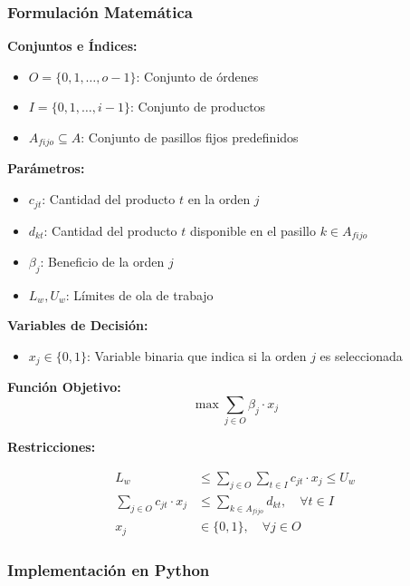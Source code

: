 \documentclass[a4paper,12pt]{article}
\begin{document}
\subsubsection{Formulación Matemática}

\textbf{Conjuntos e Índices:}
\begin{itemize}
    \item $O = \{0, 1, \ldots, o-1\}$: Conjunto de órdenes
    \item $I = \{0, 1, \ldots, i-1\}$: Conjunto de productos
    \item $A_{fijo} \subseteq A$: Conjunto de pasillos fijos predefinidos
\end{itemize}

\textbf{Parámetros:}
\begin{itemize}
    \item $c_{jt}$: Cantidad del producto $t$ en la orden $j$
    \item $d_{kt}$: Cantidad del producto $t$ disponible en el pasillo $k \in A_{fijo}$
    \item $\beta_j$: Beneficio de la orden $j$
    \item $L_w, U_w$: Límites de ola de trabajo
\end{itemize}

\textbf{Variables de Decisión:}
\begin{itemize}
    \item $x_j \in \{0,1\}$: Variable binaria que indica si la orden $j$ es seleccionada
\end{itemize}

\textbf{Función Objetivo:}
\begin{equation}
\max \sum_{j \in O} \beta_j \cdot x_j
\end{equation}

\textbf{Restricciones:}

\begin{align}
L_w &\leq \sum_{j \in O} \sum_{t \in I} c_{jt} \cdot x_j \leq U_w \label{eq:wave_limits_v1} \\
\sum_{j \in O} c_{jt} \cdot x_j &\leq \sum_{k \in A_{fijo}} d_{kt}, \quad \forall t \in I \label{eq:product_availability_v1} \\
x_j &\in \{0,1\}, \quad \forall j \in O \label{eq:binary_v1}
\end{align}

\subsubsection{Implementación en Python}
\end{document}
